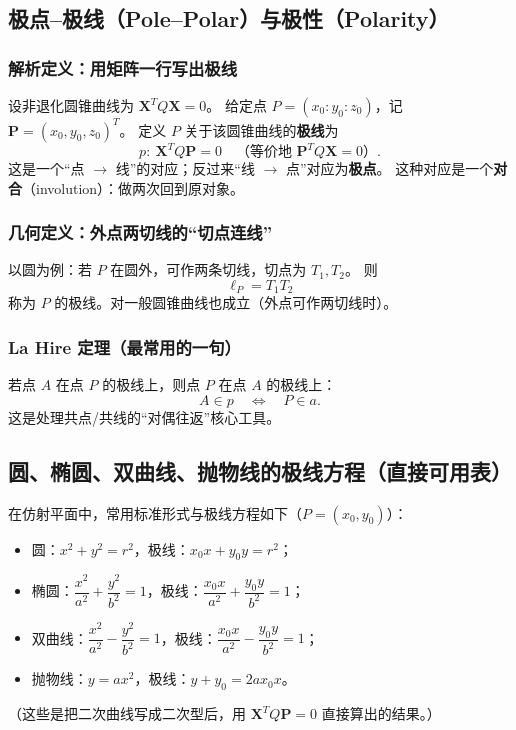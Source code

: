 \documentclass[UTF8]{ctexart}
\begin{document}
	
	\subsection{极点--极线（Pole--Polar）与极性（Polarity）}
	\subsubsection{解析定义：用矩阵一行写出极线}
	设非退化圆锥曲线为 $\mathbf{X}^TQ\mathbf{X}=0$。
	给定点 $P=(x_0:y_0:z_0)$，记 $\mathbf{P}=(x_0,y_0,z_0)^T$。
	定义 $P$ 关于该圆锥曲线的\textbf{极线}为
	\[
	p:\ \mathbf{X}^TQ\mathbf{P}=0
	\quad\text{（等价地 }\mathbf{P}^TQ\mathbf{X}=0\text{）}.
	\]
	这是一个“点 $\to$ 线”的对应；反过来“线 $\to$ 点”对应为\textbf{极点}。
	这种对应是一个\textbf{对合}（involution）：做两次回到原对象。
	
	\subsubsection{几何定义：外点两切线的“切点连线”}
	以圆为例：若 $P$ 在圆外，可作两条切线，切点为 $T_1,T_2$。
	则
	\[
	\ell_P = T_1T_2
	\]
	称为 $P$ 的极线。对一般圆锥曲线也成立（外点可作两切线时）。
	
	\subsubsection{La Hire 定理（最常用的一句）}
	若点 $A$ 在点 $P$ 的极线上，则点 $P$ 在点 $A$ 的极线上：
	\[
	A\in p \quad\Longleftrightarrow\quad P\in a.
	\]
	这是处理共点/共线的“对偶往返”核心工具。
	
	\subsection{圆、椭圆、双曲线、抛物线的极线方程（直接可用表）}
	在仿射平面中，常用标准形式与极线方程如下（$P=(x_0,y_0)$）：
	\begin{itemize}
		\item 圆：$x^2+y^2=r^2$，极线：$x_0x+y_0y=r^2$；
		\item 椭圆：$\dfrac{x^2}{a^2}+\dfrac{y^2}{b^2}=1$，极线：$\dfrac{x_0x}{a^2}+\dfrac{y_0y}{b^2}=1$；
		\item 双曲线：$\dfrac{x^2}{a^2}-\dfrac{y^2}{b^2}=1$，极线：$\dfrac{x_0x}{a^2}-\dfrac{y_0y}{b^2}=1$；
		\item 抛物线：$y=ax^2$，极线：$y+y_0=2ax_0x$。
	\end{itemize}
	（这些是把二次曲线写成二次型后，用 $\mathbf{X}^TQ\mathbf{P}=0$ 直接算出的结果。）
	
\end{document}
